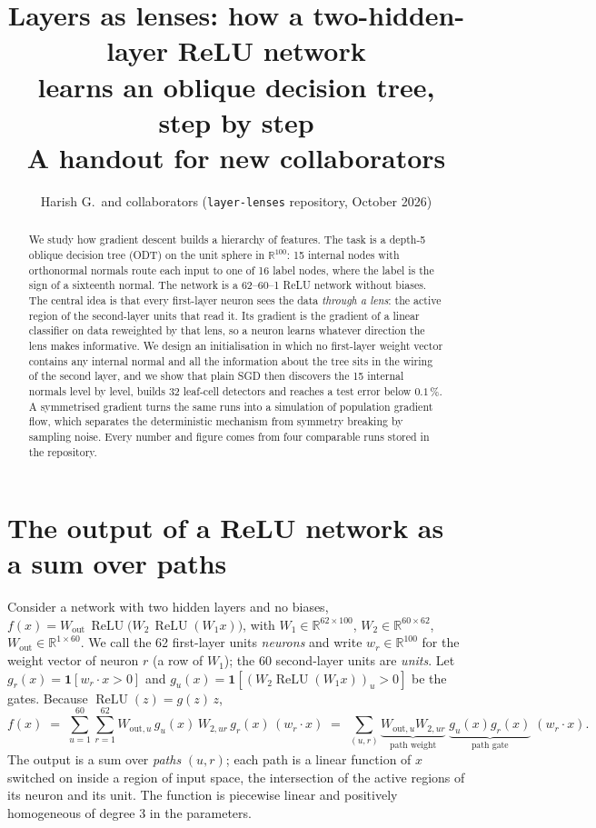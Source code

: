 \documentclass[10pt,a4paper]{article}
\title{\vspace{-1.2cm}Layers as lenses: how a two-hidden-layer ReLU network\\ learns an oblique decision tree, step by step\\[2pt] {\large A handout for new collaborators}}
\author{Harish G.\ and collaborators \quad (\texttt{layer-lenses} repository, October 2026)}
\date{}
\newcommand{\relu}{\operatorname{ReLU}}
\newcommand{\R}{\mathbb{R}}
\begin{document}
\maketitle
\vspace{-0.9cm}
\begin{abstract}\noindent
We study how gradient descent builds a hierarchy of features. The task is a depth-5 oblique decision tree (ODT) on the unit sphere in $\R^{100}$: 15 internal nodes with orthonormal normals route each input to one of 16 label nodes, where the label is the sign of a sixteenth normal. The network is a 62--60--1 ReLU network without biases. The central idea is that every first-layer neuron sees the data \emph{through a lens}: the active region of the second-layer units that read it. Its gradient is the gradient of a linear classifier on data reweighted by that lens, so a neuron learns whatever direction the lens makes informative. We design an initialisation in which no first-layer weight vector contains any internal normal and all the information about the tree sits in the wiring of the second layer, and we show that plain SGD then discovers the 15 internal normals level by level, builds 32 leaf-cell detectors and reaches a test error below $0.1\,\%$. A symmetrised gradient turns the same runs into a simulation of population gradient flow, which separates the deterministic mechanism from symmetry breaking by sampling noise. Every number and figure comes from four comparable runs stored in the repository.
\end{abstract}

\section{The output of a ReLU network as a sum over paths}
Consider a network with two hidden layers and no biases, $f(x) = W_{\mathrm{out}}\,\relu\!\big(W_2\,\relu(W_1 x)\big)$, with $W_1\in\R^{62\times 100}$, $W_2\in\R^{60\times 62}$, $W_{\mathrm{out}}\in\R^{1\times 60}$. We call the 62 first-layer units \emph{neurons} and write $w_r\in\R^{100}$ for the weight vector of neuron $r$ (a row of $W_1$); the 60 second-layer units are \emph{units}. Let $g_r(x)=\mathbf 1[w_r\cdot x>0]$ and $g_u(x)=\mathbf 1[(W_2\relu(W_1x))_u>0]$ be the gates. Because $\relu(z)=g(z)\,z$,
\begin{equation}
f(x)\;=\;\sum_{u=1}^{60}\sum_{r=1}^{62} W_{\mathrm{out},u}\, g_u(x)\, W_{2,ur}\, g_r(x)\, (w_r\cdot x)
\;=\;\sum_{(u,r)} \underbrace{W_{\mathrm{out},u} W_{2,ur}}_{\text{path weight}}\;\underbrace{g_u(x)g_r(x)}_{\text{path gate}}\;(w_r\cdot x).
\label{eq:paths}
\end{equation}
The output is a sum over \emph{paths} $(u,r)$; each path is a linear function of $x$ switched on inside a region of input space, the intersection of the active regions of its neuron and its unit. The function is piecewise linear and positively homogeneous of degree 3 in the parameters.
\end{document}
